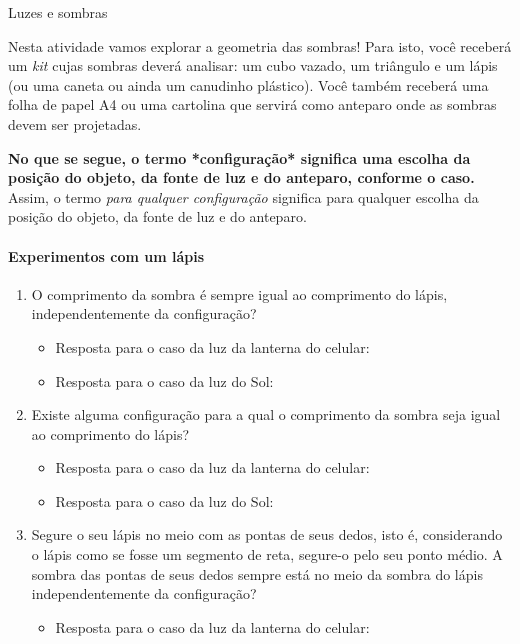 \label{\detokenize{GE301-2:explorando-projecoes-em-perspectiva-e-projecoes-paralelas}}\label{\detokenize{GE301-2::doc}}\label{\detokenize{GE301-2:ativ-proj-luz-e-sombras}}
\begin{task}{Luzes e sombras}

Nesta atividade vamos explorar a geometria das sombras! Para isto, você receberá um \emph{kit} cujas sombras deverá analisar: um cubo vazado, um triângulo e um lápis (ou uma caneta ou ainda um canudinho plástico). Você também receberá uma folha de papel A4 ou uma cartolina que servirá como anteparo onde as sombras devem ser projetadas.

\textbf{No que se segue, o termo *configuração* significa uma escolha da posição do objeto, da fonte de luz e do anteparo, conforme o caso.} Assim, o termo \emph{para qualquer configuração} significa para qualquer escolha da posição do objeto, da fonte de luz e do anteparo.

\paragraph{Experimentos com um lápis}
\begin{enumerate}
\item {} 
O comprimento da sombra é sempre igual ao comprimento do lápis, independentemente da configuração?
\begin{itemize}
\item {} 
Resposta para o caso da luz da lanterna do celular:

\item {} 
Resposta para o caso da luz do Sol:

\end{itemize}

\item {} 
Existe alguma configuração para a qual o comprimento da sombra seja igual ao comprimento do lápis?
\begin{itemize}
\item {} 
Resposta para o caso da luz da lanterna do celular:

\item {} 
Resposta para o caso da luz do Sol:

\end{itemize}

\item {} 
Segure o seu lápis no meio com as pontas de seus dedos, isto é, considerando o lápis como se fosse um segmento de reta, segure-o pelo seu ponto médio. A sombra das pontas de seus dedos sempre está no meio da sombra do lápis independentemente da configuração?
\begin{itemize}
\item {} 
Resposta para o caso da luz da lanterna do celular:


\end{itemize}
\end{enumerate}
\end{task}
